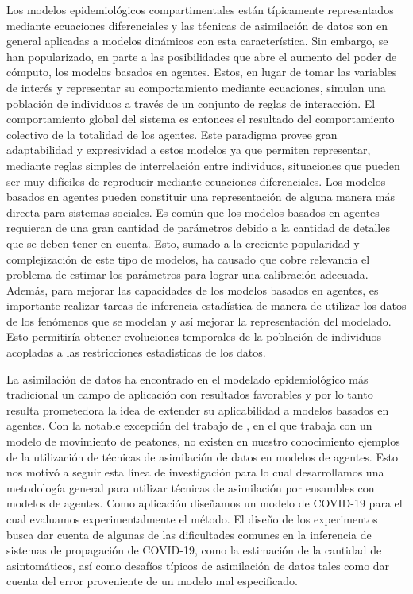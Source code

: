 Los modelos epidemiológicos compartimentales están típicamente representados mediante ecuaciones diferenciales y las técnicas de asimilación de datos son en general aplicadas a modelos dinámicos con esta característica. Sin embargo, se han popularizado, en parte a las posibilidades que abre el aumento del poder de cómputo, los modelos basados en agentes. Estos, en lugar de tomar las variables de interés y representar su comportamiento mediante ecuaciones, simulan una población de individuos a través de un conjunto de reglas de interacción. El comportamiento global del sistema es entonces el resultado del comportamiento colectivo de la totalidad de los agentes. Este paradigma provee gran adaptabilidad y expresividad a estos modelos ya que permiten representar, mediante reglas simples de interrelación entre individuos, situaciones que pueden ser muy difíciles de reproducir mediante ecuaciones diferenciales.
Los modelos basados en agentes pueden constituir una representación de alguna manera más directa para sistemas sociales. Es común que los modelos basados en agentes requieran de una gran cantidad de parámetros debido a la cantidad de detalles que se deben tener en cuenta. Esto, sumado a la creciente popularidad y complejización de este tipo de modelos, ha causado que cobre relevancia el problema de estimar los parámetros para lograr una calibración adecuada. Además, para mejorar las capacidades de los modelos basados en agentes, es importante realizar tareas de inferencia estadística de manera de utilizar los datos de los fenómenos que se modelan y así mejorar la representación del modelado. Esto permitiría obtener evoluciones temporales de la población de individuos acopladas a las restricciones estadisticas de los datos.

La asimilación de datos ha encontrado en el modelado epidemiológico más tradicional un campo de aplicación con resultados favorables y por lo tanto resulta prometedora la idea de extender su aplicabilidad a modelos basados en agentes. Con la notable excepción del trabajo de \cite{Ward2016}, en el que trabaja con un modelo de movimiento de peatones, no existen en nuestro conocimiento ejemplos de la utilización de técnicas de asimilación de datos en modelos de agentes. Esto nos motivó a seguir esta línea de investigación para lo cual desarrollamos una metodología general para utilizar técnicas de asimilación por ensambles con modelos de agentes. Como aplicación diseñamos un modelo de COVID-19 para el cual evaluamos experimentalmente el método. El diseño de los experimentos busca dar cuenta de algunas de las dificultades comunes en la inferencia de sistemas de propagación de COVID-19, como la estimación de la cantidad de asintomáticos, así como desafíos típicos de asimilación de datos tales como dar cuenta del error proveniente de un modelo mal especificado.

